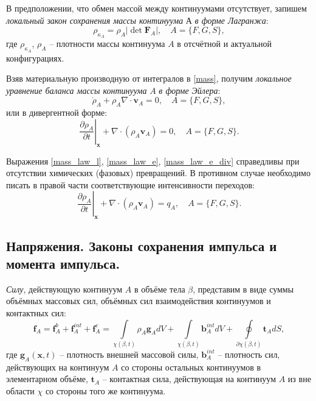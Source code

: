 	В предположении, что обмен массой между континуумами отсутствует, запишем \textit{локальный закон сохранения массы континуума} $А$ \textit{в форме Лагранжа}:
\begin{equation}
	\label{mass_law_l}
	\rho_{\kappa_A} = \rho_A \left|\det \boldsymbol{F}_A\right|, \quad A=\{F, G, S\},
\end{equation}
	где $\rho_{\kappa_A}$, $\rho_A$ -- плотности массы континуума $A$ в отсчётной и актуальной конфигурациях.
	
	Взяв материальную производную от интегралов в \eqref{mass}, получим \textit{локальное уравнение баланса массы континуума} $A$ \textit{в форме Эйлера}:
\begin{equation}
	\label{mass_law_e}
	\dot{\rho}_A + \rho_A \nabla \cdot \boldsymbol{v}_A = 0, \quad A=\{F, G, S\},
\end{equation}
	или в дивергентной форме:
\begin{equation}
	\label{mass_law_e_div}
	\left.\frac{\partial \rho_A}{\partial t}\right|_{\boldsymbol{x}} + \nabla \cdot \left(\rho_A \boldsymbol{v}_A\right) = 0, \quad A=\{F, G, S\}.
\end{equation}
	
	Выражения \eqref{mass_law_l}, \eqref{mass_law_e}, \eqref{mass_law_e_div} справедливы при отсутствии химических (фазовых) превращений. В противном случае необходимо писать в правой части соответствующие интенсивности переходов:
\begin{equation}
	\label{mass_law_e_div1}
	\left.\frac{\partial \rho_A}{\partial t}\right|_{\boldsymbol{x}} + \nabla \cdot \left(\rho_A \boldsymbol{v}_A\right) = q_A, \quad A=\{F, G, S\}.
\end{equation}

\subsection{Напряжения. Законы сохранения импульса и момента импульса.}
	\textit{Силу}, действующую континуум $A$ в объёме тела $\beta$, представим в виде суммы объёмных массовых сил, объёмных сил взаимодействия континуумов и контактных сил:
\begin{equation}
	\label{force_A}
	\boldsymbol{f}_A = \boldsymbol{f}_A^b + \boldsymbol{f}_A^{int} + \boldsymbol{f}_A^c = \int\limits_{\chi({\beta}, t)}\rho_A \boldsymbol{g}_A dV + \int\limits_{\chi({\beta}, t)}\boldsymbol{b}_A^{int} dV + \oint\limits_{\partial\chi({\beta}, t)}\boldsymbol{t}_A dS,
\end{equation}
	где $\boldsymbol{g}_A(\boldsymbol{x}, t)$ -- плотность внешней массовой силы,
	$\boldsymbol{b}_A^{int}$ -- плотность сил, действующих на континуум $A$ со стороны остальных континуумов в элементарном объёме,
	$\boldsymbol{t}_A$ -- контактная сила, действующая на континуум $A$ из вне области $\chi$ со стороны того же континуума.

